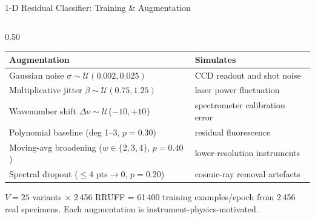 \documentclass[aspectratio=169,10pt]{beamer}
\begin{document}
\begin{frame}{1-D Residual Classifier: Training \& Augmentation}
\begin{columns}[T]
\begin{column}{0.50\textwidth}
      \vspace{0.03cm}
      \footnotesize
      \begin{tabular}{@{}lp{4.2cm}@{}}
        \toprule
        \textbf{Augmentation} & \textbf{Simulates}\\
        \midrule
        Gaussian noise $\sigma\!\sim\!\mathcal{U}(0.002,0.025)$
          & CCD readout and shot noise\\
        Multiplicative jitter $\beta\!\sim\!\mathcal{U}(0.75,1.25)$
          & laser power fluctuation\\
        Wavenumber shift $\Delta\nu\!\sim\!\mathcal{U}\{-10,{+}10\}$
          & spectrometer calibration error\\
        Polynomial baseline (deg 1--3, $p{=}0.30$)
          & residual fluorescence\\
        Moving-avg broadening ($w\!\in\!\{2,3,4\}$, $p{=}0.40$)
          & lower-resolution instruments\\
        Spectral dropout ($\le4$ pts$\to0$, $p{=}0.20$)
          & cosmic-ray removal artefacts\\
        \bottomrule
      \end{tabular}

      \vspace{0.06cm}
      \begin{tcolorbox}[insightbox, top=2pt, bottom=2pt]
        \scriptsize $V{=}25$ variants $\times$ 2\,456 RRUFF = 61\,400
        training examples/epoch from 2\,456 real specimens.
        Each augmentation is instrument-physics-motivated.
      \end{tcolorbox}
    \end{column}
  \end{columns}
\end{frame}
\end{document}
